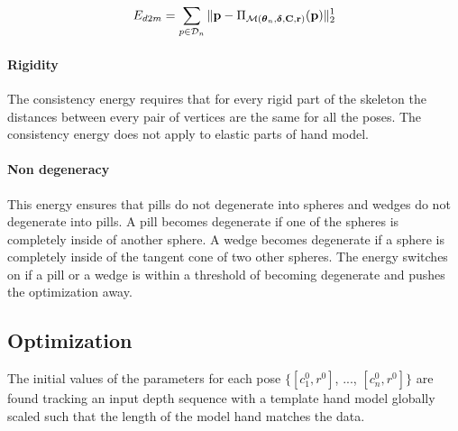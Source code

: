 \begin{equation}
E_{d2m} = \sum_{p \in \mathcal{D}_n} \| \mathbf{p} - \Pi_{\mathcal{M}(\boldsymbol{\theta}_n, \boldsymbol{\delta}, \mathbf{C}, \mathbf{r})}(\mathbf{p})\|_2^1
\end{equation}


\paragraph{Rigidity}
The consistency energy requires that for every rigid part of the skeleton the distances between every pair of vertices are the same for all the poses. The consistency energy does not apply to elastic parts of hand model.

\paragraph{Non degeneracy}
This energy ensures that pills do not degenerate into spheres and wedges do not degenerate into pills.
A pill becomes degenerate if one of the spheres is completely inside of another sphere. A wedge becomes degenerate if a sphere is completely inside of the tangent cone of two other spheres. The energy switches on if a pill or a wedge is within a threshold of becoming degenerate and pushes the optimization away.


\subsection{Optimization}
\begin{DRAFT}
The initial values of the parameters for each pose  $\{[c^0_1 , r^0]$, ..., $[c^0_n, r^0]\}$ are found tracking an input depth sequence with a template hand model globally scaled such that the length of the model hand matches the data.
\end{DRAFT}

